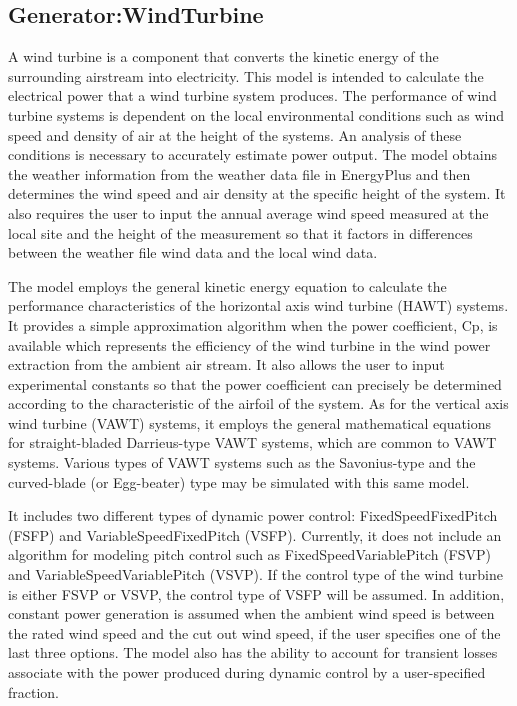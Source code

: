 \subsection{Generator:WindTurbine}\label{generatorwindturbine}

A wind turbine is a component that converts the kinetic energy of the surrounding airstream into electricity. This model is intended to calculate the electrical power that a wind turbine system produces. The performance of wind turbine systems is dependent on the local environmental conditions such as wind speed and density of air at the height of the systems. An analysis of these conditions is necessary to accurately estimate power output. The model obtains the weather information from the weather data file in EnergyPlus and then determines the wind speed and air density at the specific height of the system. It also requires the user to input the annual average wind speed measured at the local site and the height of the measurement so that it factors in differences between the weather file wind data and the local wind data.

The model employs the general kinetic energy equation to calculate the performance characteristics of the horizontal axis wind turbine (HAWT) systems. It provides a simple approximation algorithm when the power coefficient, Cp, is available which represents the efficiency of the wind turbine in the wind power extraction from the ambient air stream. It also allows the user to input experimental constants so that the power coefficient can precisely be determined according to the characteristic of the airfoil of the system. As for the vertical axis wind turbine (VAWT) systems, it employs the general mathematical equations for straight-bladed Darrieus-type VAWT systems, which are common to VAWT systems. Various types of VAWT systems such as the Savonius-type and the curved-blade (or Egg-beater) type may be simulated with this same model.

It includes two different types of dynamic power control: FixedSpeedFixedPitch (FSFP) and VariableSpeedFixedPitch (VSFP). Currently, it does not include an algorithm for modeling pitch control such as FixedSpeedVariablePitch (FSVP) and VariableSpeedVariablePitch (VSVP). If the control type of the wind turbine is either FSVP or VSVP, the control type of VSFP will be assumed. In addition, constant power generation is assumed when the ambient wind speed is between the rated wind speed and the cut out wind speed, if the user specifies one of the last three options. The model also has the ability to account for transient losses associate with the power produced during dynamic control by a user-specified fraction.

